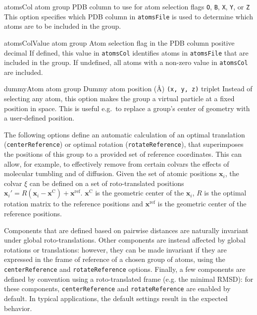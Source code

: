 \begin{itemize}
{\item %
  \key
    {atomsCol}{%
    atom group}{%
    PDB column to use for atom selection flags}{%
    \texttt{O}, \texttt{B}, \texttt{X}, \texttt{Y}, or \texttt{Z}}{%
    This option specifies which PDB column in \texttt{atomsFile} is used to determine which atoms are to be included in the group.
  }

\item %
  \key
    {atomsColValue}{%
    atom group}{%
    Atom selection flag in the PDB column}{%
    positive decimal}{%
    If defined, this value in \texttt{atomsCol} identifies atoms in \texttt{atomsFile} that are included in the group.
    If undefined, all atoms with a non-zero value in \texttt{atomsCol} are included.}
}

\item %
  \key
    {dummyAtom}{%
    atom group}{%
    Dummy atom position (\AA{})}{%
    \texttt{(x, y, z)} triplet}{%
    Instead of selecting any atom, this option makes the group a virtual particle at a fixed position in space.  This is useful e.g.~to replace a group's center of geometry with a user-defined position.}

\end{itemize}

\label{sec:colvar_atom_groups_ref_frame}

The following options define an automatic calculation of an optimal translation (\texttt{centerReference}) or optimal rotation (\texttt{rotateReference}), that superimposes the positions of this group to a provided set of reference coordinates.
This can allow, for example, to effectively remove from certain colvars the effects of molecular tumbling and of diffusion.
Given the set of atomic positions $\mathbf{x}_{i}$, the colvar $\xi$ can be defined on a set of roto-translated positions $\mathbf{x}_{i}' = R(\mathbf{x}_{i} - \mathbf{x}^{\mathrm{C}}) + \mathbf{x}^{\mathrm{ref}}$.
$\mathbf{x}^{\mathrm{C}}$ is the geometric center of the $\mathbf{x}_{i}$, $R$ is the optimal rotation matrix to the reference positions and $\mathbf{x}^{\mathrm{ref}}$ is the geometric center of the reference positions.

Components that are defined based on pairwise distances are naturally invariant under global roto-translations.
Other components are instead affected by global rotations or translations: however, they can be made invariant if they are expressed in the frame of reference of a chosen group of atoms, using the \texttt{centerReference} and \texttt{rotateReference} options.
Finally, a few components are defined by convention using a roto-translated frame (e.g. the minimal RMSD): for these components, \texttt{centerReference} and \texttt{rotateReference} are enabled by default.
In typical applications, the default settings result in the expected behavior.


